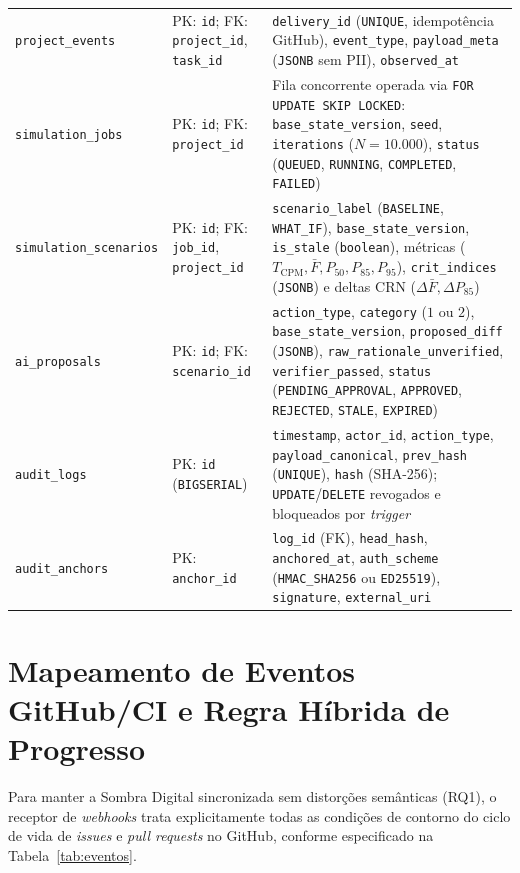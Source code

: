 \documentclass[12pt,openany,oneside,a4paper,english,brazilian,sumario=tradicional]{abntex2}
\newcommand{\fonteautores}{\par\vspace{1mm}{\small Fonte: Elaborado pelos autores (2026).}}
\begin{document}
\begin{table}[htbp]
{\begin{tabularx}{\textwidth}{L{3.35cm} L{2.75cm} Y}
\texttt{project\_events} & PK: \texttt{id}; FK: \texttt{project\_id}, \texttt{task\_id} & \texttt{delivery\_id} (\texttt{UNIQUE}, idempotência GitHub), \texttt{event\_type}, \texttt{payload\_meta} (\texttt{JSONB} sem PII), \texttt{observed\_at}\\
\texttt{simulation\_jobs} & PK: \texttt{id}; FK: \texttt{project\_id} & Fila concorrente operada via \texttt{FOR UPDATE SKIP LOCKED}: \texttt{base\_state\_version}, \texttt{seed}, \texttt{iterations} ($N=10.000$), \texttt{status} (\texttt{QUEUED}, \texttt{RUNNING}, \texttt{COMPLETED}, \texttt{FAILED})\\
\texttt{simulation\_scenarios} & PK: \texttt{id}; FK: \texttt{job\_id}, \texttt{project\_id} & \texttt{scenario\_label} (\texttt{BASELINE}, \texttt{WHAT\_IF}), \texttt{base\_state\_version}, \texttt{is\_stale} (\texttt{boolean}), métricas ($T_{\mathrm{CPM}}, \bar{F}, P_{50}, P_{85}, P_{95}$), \texttt{crit\_indices} (\texttt{JSONB}) e deltas CRN ($\Delta\bar{F}, \Delta P_{85}$)\\
\texttt{ai\_proposals} & PK: \texttt{id}; FK: \texttt{scenario\_id} & \texttt{action\_type}, \texttt{category} ($1$ ou $2$), \texttt{base\_state\_version}, \texttt{proposed\_diff} (\texttt{JSONB}), \texttt{raw\_rationale\_unverified}, \texttt{verifier\_passed}, \texttt{status} (\texttt{PENDING\_APPROVAL}, \texttt{APPROVED}, \texttt{REJECTED}, \texttt{STALE}, \texttt{EXPIRED})\\
\texttt{audit\_logs} & PK: \texttt{id} (\texttt{BIGSERIAL}) & \texttt{timestamp}, \texttt{actor\_id}, \texttt{action\_type}, \texttt{payload\_canonical}, \texttt{prev\_hash} (\texttt{UNIQUE}), \texttt{hash} (SHA-256); \texttt{UPDATE}/\texttt{DELETE} revogados e bloqueados por \textit{trigger}\\
\texttt{audit\_anchors} & PK: \texttt{anchor\_id} & \texttt{log\_id} (FK), \texttt{head\_hash}, \texttt{anchored\_at}, \texttt{auth\_scheme} (\texttt{HMAC\_SHA256} ou \texttt{ED25519}), \texttt{signature}, \texttt{external\_uri}\\
\bottomrule
\end{tabularx}}
\fonteautores
\end{table}

\section{Mapeamento de Eventos GitHub/CI e Regra Híbrida de Progresso}\label{sec:eventos_git}

Para manter a Sombra Digital sincronizada sem distorções semânticas (RQ1), o receptor de \textit{webhooks} trata explicitamente todas as condições de contorno do ciclo de vida de \textit{issues} e \textit{pull requests} no GitHub, conforme especificado na Tabela~\ref{tab:eventos}.
\end{document}
